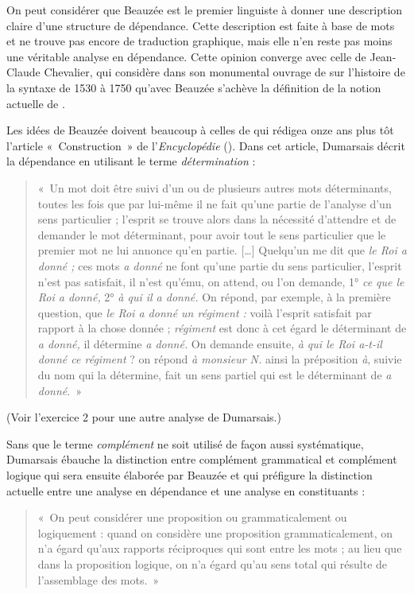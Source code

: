 {    On peut considérer que Beauzée est le premier linguiste à donner une description claire d’une structure de dépendance. Cette description est faite à base de mots et ne trouve pas encore de traduction graphique, mais elle n’en reste pas moins une véritable analyse en dépendance. Cette opinion converge avec celle de Jean-Claude Chevalier, qui considère dans son monumental ouvrage de \citeyear{chevalier1968histoire} sur l’histoire de la syntaxe de 1530 à 1750 qu’avec Beauzée s’achève la définition de la notion actuelle de .

    Les idées de Beauzée doivent beaucoup à celles de  qui rédigea onze ans plus tôt l’article «~Construction~» de l’\textit{Encyclopédie} (\citeyear{Dumarsais1754}). Dans cet article, Dumarsais décrit la dépendance en utilisant le terme \textit{détermination} : 
    \begin{quote}«~Un mot doit être suivi d’un ou de plusieurs autres mots déterminants, toutes les fois que par lui-même il ne fait qu’une partie de l’analyse d’un sens particulier ; l’esprit se trouve alors dans la nécessité d’attendre et de demander le mot déterminant, pour avoir tout le sens particulier que le premier mot ne lui annonce qu’en partie. […] Quelqu’un me dit que \textit{le Roi a donné ;} ces mots \textit{a donné} ne font qu’une partie du sens particulier, l’esprit n’est pas satisfait, il n’est qu’ému, on attend, ou l’on demande, 1° \textit{ce que le Roi a donné,} 2° \textit{à qui il a donné.} On répond, par exemple, à la première question, que \textit{le Roi a donné un régiment :} voilà l’esprit satisfait par rapport à la chose donnée ; \textit{régiment} est donc à cet égard le déterminant de \textit{a donné,} il détermine \textit{a donné.} On demande ensuite, \textit{à qui le Roi a-t-il donné ce régiment} ? on répond \textit{à monsieur N.} ainsi la préposition \textit{à}, suivie du nom qui la détermine, fait un sens partiel qui est le déterminant de \textit{a donné}.~» 
     \end{quote}
     (Voir l'exercice 2 pour une autre analyse de Dumarsais.)

    Sans que le terme \textit{complément} ne soit utilisé de façon aussi systématique, Dumarsais ébauche la distinction entre complément grammatical et complément logique qui sera ensuite élaborée par Beauzée et qui préfigure la distinction actuelle entre une analyse en dépendance et une analyse en constituants : 
    \begin{quote}«~On peut considérer une proposition ou grammaticalement ou logiquement : quand on considère une proposition grammaticalement, on n’a égard qu’aux rapports réciproques qui sont entre les mots ; au lieu que dans la proposition logique, on n’a égard qu’au sens total qui résulte de l’assemblage des mots.~» \end{quote}

}

